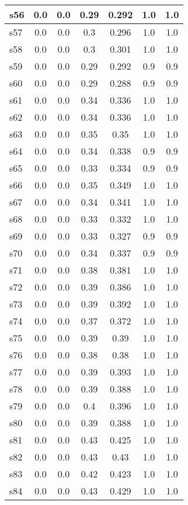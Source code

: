 \documentclass{article}
\begin{document}
\begin{tabular}{|l|c|c|c|c|c|c|}
\hline
s56 &0.0 & 0.0 & 0.29 & 0.292 & 1.0 & 1.0\\
\hline
s57 &0.0 & 0.0 & 0.3 & 0.296 & 1.0 & 1.0\\
\hline
s58 &0.0 & 0.0 & 0.3 & 0.301 & 1.0 & 1.0\\
\hline
s59 &0.0 & 0.0 & 0.29 & 0.292 & 0.9 & 0.9\\
\hline
s60 &0.0 & 0.0 & 0.29 & 0.288 & 0.9 & 0.9\\
\hline
s61 &0.0 & 0.0 & 0.34 & 0.336 & 1.0 & 1.0\\
\hline
s62 &0.0 & 0.0 & 0.34 & 0.336 & 1.0 & 1.0\\
\hline
s63 &0.0 & 0.0 & 0.35 & 0.35 & 1.0 & 1.0\\
\hline
s64 &0.0 & 0.0 & 0.34 & 0.338 & 0.9 & 0.9\\
\hline
s65 &0.0 & 0.0 & 0.33 & 0.334 & 0.9 & 0.9\\
\hline
s66 &0.0 & 0.0 & 0.35 & 0.349 & 1.0 & 1.0\\
\hline
s67 &0.0 & 0.0 & 0.34 & 0.341 & 1.0 & 1.0\\
\hline
s68 &0.0 & 0.0 & 0.33 & 0.332 & 1.0 & 1.0\\
\hline
s69 &0.0 & 0.0 & 0.33 & 0.327 & 0.9 & 0.9\\
\hline
s70 &0.0 & 0.0 & 0.34 & 0.337 & 0.9 & 0.9\\
\hline
s71 &0.0 & 0.0 & 0.38 & 0.381 & 1.0 & 1.0\\
\hline
s72 &0.0 & 0.0 & 0.39 & 0.386 & 1.0 & 1.0\\
\hline
s73 &0.0 & 0.0 & 0.39 & 0.392 & 1.0 & 1.0\\
\hline
s74 &0.0 & 0.0 & 0.37 & 0.372 & 1.0 & 1.0\\
\hline
s75 &0.0 & 0.0 & 0.39 & 0.39 & 1.0 & 1.0\\
\hline
s76 &0.0 & 0.0 & 0.38 & 0.38 & 1.0 & 1.0\\
\hline
s77 &0.0 & 0.0 & 0.39 & 0.393 & 1.0 & 1.0\\
\hline
s78 &0.0 & 0.0 & 0.39 & 0.388 & 1.0 & 1.0\\
\hline
s79 &0.0 & 0.0 & 0.4 & 0.396 & 1.0 & 1.0\\
\hline
s80 &0.0 & 0.0 & 0.39 & 0.388 & 1.0 & 1.0\\
\hline
s81 &0.0 & 0.0 & 0.43 & 0.425 & 1.0 & 1.0\\
\hline
s82 &0.0 & 0.0 & 0.43 & 0.43 & 1.0 & 1.0\\
\hline
s83 &0.0 & 0.0 & 0.42 & 0.423 & 1.0 & 1.0\\
\hline
s84 &0.0 & 0.0 & 0.43 & 0.429 & 1.0 & 1.0\\

\end{tabular}
\end{document}
